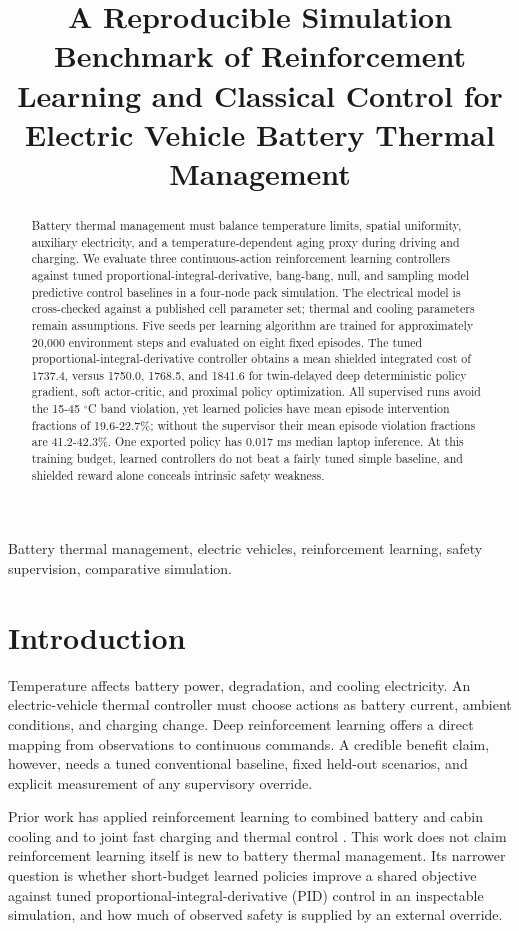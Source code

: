 \documentclass[conference]{IEEEtran}
\title{A Reproducible Simulation Benchmark of Reinforcement Learning and Classical Control for Electric Vehicle Battery Thermal Management}
\author{\IEEEauthorblockN{Rishuraj Singh, Nihaal Sansanwal, Harshit Singh Parmar, Chaitanya Sharma}
\IEEEauthorblockA{IILM University, Greater Noida, India}}
\begin{document}
\maketitle
\begin{abstract}Battery thermal management must balance temperature limits, spatial uniformity, auxiliary electricity, and a temperature-dependent aging proxy during driving and charging. We evaluate three continuous-action reinforcement learning controllers against tuned proportional-integral-derivative, bang-bang, null, and sampling model predictive control baselines in a four-node pack simulation. The electrical model is cross-checked against a published cell parameter set; thermal and cooling parameters remain assumptions. Five seeds per learning algorithm are trained for approximately 20,000 environment steps and evaluated on eight fixed episodes. The tuned proportional-integral-derivative controller obtains a mean shielded integrated cost of 1737.4, versus 1750.0, 1768.5, and 1841.6 for twin-delayed deep deterministic policy gradient, soft actor-critic, and proximal policy optimization. All supervised runs avoid the 15-45 $^{\circ}$C band violation, yet learned policies have mean episode intervention fractions of 19.6-22.7\%; without the supervisor their mean episode violation fractions are 41.2-42.3\%. One exported policy has 0.017 ms median laptop inference. At this training budget, learned controllers do not beat a fairly tuned simple baseline, and shielded reward alone conceals intrinsic safety weakness.\end{abstract}
\begin{IEEEkeywords}Battery thermal management, electric vehicles, reinforcement learning, safety supervision, comparative simulation.\end{IEEEkeywords}
\section{Introduction}
Temperature affects battery power, degradation, and cooling electricity. An electric-vehicle thermal controller must choose actions as battery current, ambient conditions, and charging change. Deep reinforcement learning offers a direct mapping from observations to continuous commands. A credible benefit claim, however, needs a tuned conventional baseline, fixed held-out scenarios, and explicit measurement of any supervisory override.

Prior work has applied reinforcement learning to combined battery and cabin cooling \cite{r1} and to joint fast charging and thermal control \cite{r2}. This work does not claim reinforcement learning itself is new to battery thermal management. Its narrower question is whether short-budget learned policies improve a shared objective against tuned proportional-integral-derivative (PID) control in an inspectable simulation, and how much of observed safety is supplied by an external override.
\end{document}

